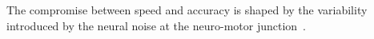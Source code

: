 \documentclass[12pt,english]{article}%
\newcommand{\citep}[1]{\parencite{#1}}
\newcommand{\citet}[1]{\textcite{#1}}
\begin{document}
%

The compromise between speed and accuracy is shaped
by the variability introduced by the neural noise
at the neuro-motor junction~\citep{Harris98}.
\end{document}
